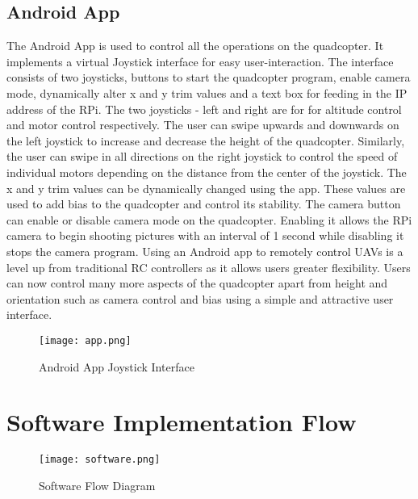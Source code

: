 \subsection{Android App}
The Android App is used to control all the operations on the quadcopter. It implements a virtual Joystick interface for easy user-interaction.
The interface consists of two joysticks, buttons to start the quadcopter program, enable camera mode, dynamically alter x and y trim values and a text box for feeding in the IP address of the RPi.
\newline
The two joysticks - left and right are for for altitude control and motor control respectively. The user can swipe upwards and downwards on the left joystick to increase and decrease the height of the quadcopter.  Similarly, the user can swipe in all directions on the right joystick to control the speed of individual motors depending on the distance from the center of the joystick. 
\newline
The x and y trim values can be dynamically changed using the app. These values are used to add bias to the quadcopter and control its stability. 
\newline
The camera button can enable or disable camera mode on the quadcopter. Enabling it allows the RPi camera to begin shooting pictures with an interval of 1 second while disabling it stops the camera program.
\newline
Using an Android app to remotely control UAVs is a level up from traditional RC controllers as it allows users greater flexibility. Users can now control many more aspects of the quadcopter apart from height and orientation such as camera control and bias using a simple and attractive user interface.

\begin{figure}[H]
  \centering
  \texttt{[image: app.png]}
  \caption{Android App Joystick Interface}
  \label{app} 
\end{figure}

\section{Software Implementation Flow}

\begin{figure}[H]
  \centering
  \texttt{[image: software.png]}
  \caption{Software Flow Diagram}
  \label{Software Flow}	
\end{figure}

